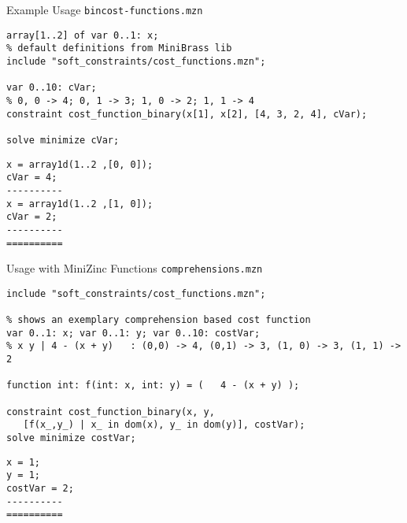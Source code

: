 \documentclass[handout,10pt,xcolor={dvipsnames},fleqn]{beamer}
\begin{document}
\begin{frame}[fragile]{Example Usage}
\texttt{bincost-functions.mzn}
\begin{lstlisting}
array[1..2] of var 0..1: x; 
% default definitions from MiniBrass lib
include "soft_constraints/cost_functions.mzn";

var 0..10: cVar;
% 0, 0 -> 4; 0, 1 -> 3; 1, 0 -> 2; 1, 1 -> 4
constraint cost_function_binary(x[1], x[2], [4, 3, 2, 4], cVar);

solve minimize cVar;

\end{lstlisting}
\small
\begin{verbatim}
x = array1d(1..2 ,[0, 0]);
cVar = 4;
----------
x = array1d(1..2 ,[1, 0]);
cVar = 2;
----------
==========
\end{verbatim}
\end{frame}

\begin{frame}[fragile]{Usage with MiniZinc Functions}
\texttt{comprehensions.mzn}
\begin{lstlisting}
include "soft_constraints/cost_functions.mzn";

% shows an exemplary comprehension based cost function
var 0..1: x; var 0..1: y; var 0..10: costVar;
% x y | 4 - (x + y)   : (0,0) -> 4, (0,1) -> 3, (1, 0) -> 3, (1, 1) -> 2

function int: f(int: x, int: y) = (   4 - (x + y) );

constraint cost_function_binary(x, y, 
   [f(x_,y_) | x_ in dom(x), y_ in dom(y)], costVar);
solve minimize costVar;
\end{lstlisting}
\small
\begin{verbatim}
x = 1;
y = 1;
costVar = 2;
----------
==========
\end{verbatim}
\end{frame}
\end{document}
